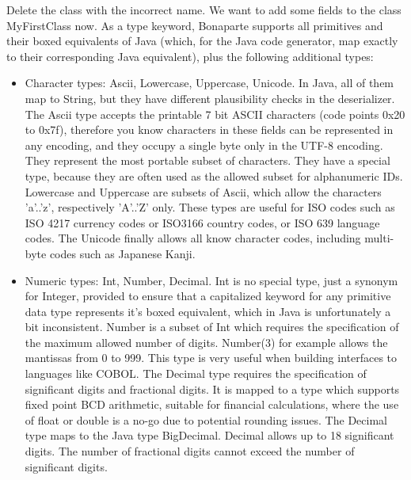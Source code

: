 \documentclass[11pt,a4paper,oneside]{article}
\begin{document}
Delete the class with the incorrect name. We want to add some fields to the class {\ttfamily MyFirstClass} now. As a type keyword, Bonaparte supports all
primitives and their boxed equivalents of Java (which, for the Java code generator, map exactly to their corresponding Java equivalent), plus the following additional types:
 
\begin{itemize}
  \item Character types:  {\ttfamily Ascii}, {\ttfamily Lowercase}, {\ttfamily Uppercase}, {\ttfamily Unicode}. In Java, all of them map to {\ttfamily String},
   but they have different plausibility checks in the deserializer. The {\ttfamily Ascii} type accepts the printable 7 bit ASCII characters
    (code points 0x20 to 0x7f), therefore you know characters in these fields can be represented in any encoding, and they occupy a single byte only in the
     UTF-8 encoding. They represent the most portable subset of characters. They have a special type, because they are often used as the allowed subset for
      alphanumeric IDs. {\ttfamily Lowercase} and {\ttfamily Uppercase} are subsets of {\ttfamily Ascii}, which allow the characters {\ttfamily 'a'..'z'},
      respectively {\ttfamily 'A'..'Z'} only. These types are useful for ISO codes such as ISO 4217 currency codes or ISO3166 country codes, or ISO 639
       language codes.  The {\ttfamily Unicode} finally allows all know character codes, including multi-byte codes such as Japanese Kanji.
  \item Numeric types: {\ttfamily Int}, {\ttfamily Number}, {\ttfamily Decimal}.  {\ttfamily Int} is no special type, just a synonym for {\ttfamily Integer},
      provided to ensure that a capitalized keyword for any primitive data type represents it's boxed equivalent, which in Java is unfortunately a bit inconsistent.
      {\ttfamily Number} is a subset of {\ttfamily Int} which requires the specification of the maximum allowed number of digits. {\ttfamily Number(3)}
       for example allows the mantissas from 0 to 999. This type is very useful when building interfaces to languages like COBOL. The {\ttfamily Decimal} type 
      requires the specification of significant digits and fractional digits. It is mapped to a type which supports fixed point BCD arithmetic, suitable for
      financial calculations, where the use of {\ttfamily float} or {\ttfamily double} is a no-go due to potential rounding issues. The {\ttfamily Decimal} type
      maps to the Java type BigDecimal. {\ttfamily Decimal} allows up to 18 significant digits. The number of fractional digits cannot exceed the number of significant digits.

\end{itemize}
\end{document}

